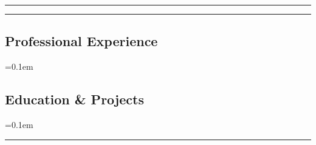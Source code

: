 






\hrule
\begin{description*}
  
  
\end{description*}


\hrule
\vspace{-0.4em}
\subsection*{Professional Experience}
\begin{itemize}
  \parskip=0.1em

  
  
  
  
  
  
  
\end{itemize}




\clearpage


\vspace{-0.4em}
\subsection*{Education \& Projects}
\begin{itemize}
  \parskip=0.1em

  
  
  
  
\end{itemize}
\hrule


\begin{description*}
  
\end{description*}

